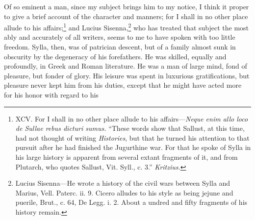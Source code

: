 Of so eminent a man, since my subject brings him to my notice, I think
it proper to give a brief account of the character and manners; for I
shall in no other place allude to his affairs;\footnote{XCV. For I shall in no other place allude to his affairs—\emph{Neque
enim allo loco de Sullae rebus dicturi sumus.} ``These words show that
Sallust, at this time, had not thought of writing \emph{Histories}, but
that he turned his attention to that pursuit after he had finished
the Jugurthine war. For that he spoke of Sylla in his large history
is apparent from several extant fragments of it, and from Plutarch,
who quotes Sallust, Vit. Syll., c. 3.'' \emph{Kritzius.}} and Lucius
Sisenna,\footnote{Lucius Sisenna—He wrote a history of the civil wars between
Sylla and Marius, Vell. Paterc. ii. 9. Cicero alludes to his style
as being jejune and puerile, Brut., c. 64, De Legg. i. 2. About a
undred and fifty fragments of his history remain.} who has treated that subject the most ably and accurately
of all writers, seems to me to have spoken with too little freedom.
Sylla, then, was of patrician descent, but of a family almost sunk in
obscurity by the degeneracy of his forefathers. He was skilled, equally
and profoundly, in Greek and Roman literature. He was a man of large
mind, fond of pleasure, but fonder of glory. His leisure was spent in
luxurious gratifications, but pleasure never kept him from his duties,
except that he might have acted more for his honor with regard to his

